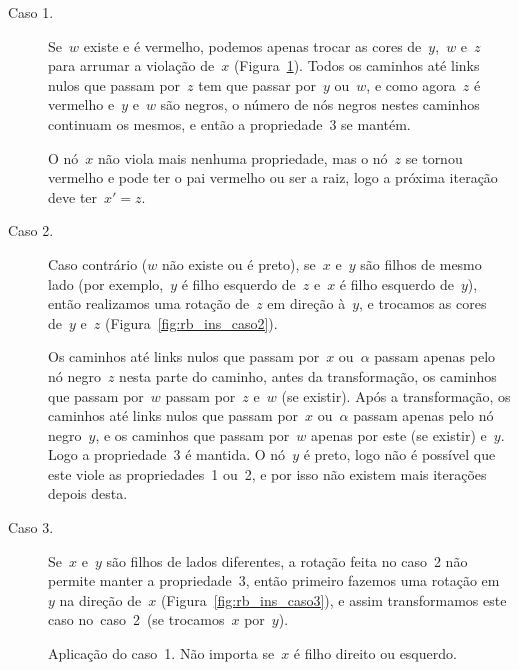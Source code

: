 \documentclass[main.tex]{subfiles}
\begin{document}
\begin{description}
	\item[Caso 1.] Se~$w$ existe e é vermelho, podemos apenas trocar as cores de~$y$,~$w$ e~$z$ para arrumar a violação de~$x$ (Figura~\ref{fig:rb_ins_caso1}). Todos os caminhos até links nulos que passam por~$z$ tem que passar por~$y$ ou~$w$, e como agora~$z$ é vermelho e~$y$ e~$w$ são negros, o número de nós negros nestes caminhos continuam os mesmos, e então a propriedade~3 se mantém.

	O nó~$x$ não viola mais nenhuma propriedade, mas o nó~$z$ se tornou vermelho e pode ter o pai vermelho ou ser a raiz, logo a próxima iteração deve ter~$x' = z$.

\item[Caso 2.] Caso contrário ($w$ não existe ou é preto), se~$x$ e~$y$ são filhos de mesmo lado (por exemplo,~$y$ é filho esquerdo de~$z$ e~$x$ é filho esquerdo de~$y$), então realizamos uma rotação de~$z$ em direção à~$y$, e trocamos as cores de~$y$ e~$z$ (Figura~\ref{fig:rb_ins_caso2}).

	Os caminhos até links nulos que passam por~$x$ ou~$\alpha$ passam apenas pelo nó negro~$z$ nesta parte do caminho, antes da transformação, os caminhos que passam por~$w$ passam por~$z$ e~$w$ (se existir). Após a transformação, os caminhos até links nulos que passam por~$x$ ou~$\alpha$ passam apenas pelo nó negro~$y$, e os caminhos que passam por~$w$ apenas por este (se existir) e~$y$. Logo a propriedade~3 é mantida. O nó~$y$ é preto, logo não é possível que este viole as propriedades~1 ou~2, e por isso não existem mais iterações depois desta.

\item[Caso 3.] Se~$x$ e~$y$ são filhos de lados diferentes, a rotação feita no caso~2 não permite manter a propriedade~3, então primeiro fazemos uma rotação em~$y$ na direção de~$x$ (Figura~\ref{fig:rb_ins_caso3}), e assim transformamos este caso no~caso~2~(se trocamos~$x$ por~$y$).

\end{description}

\begin{figure}
\centering
{}
\caption{Aplicação do caso~1. Não importa se~$x$ é filho direito ou esquerdo.} \label{fig:rb_ins_caso1}
\end{figure}
\end{document}
